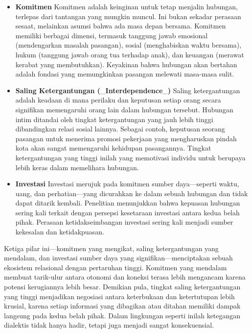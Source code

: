 \documentclass[
  letterpaper,
  DIV=11,
  numbers=noendperiod]{scrreprt}
\providecommand{\tightlist}{%
  \setlength{\itemsep}{0pt}\setlength{\parskip}{0pt}}
\begin{document}
\begin{itemize}
\tightlist
\item
  \textbf{Komitmen} Komitmen adalah keinginan untuk tetap menjalin
  hubungan, terlepas dari tantangan yang mungkin muncul. Ini bukan
  sekadar perasaan sesaat, melainkan asumsi bahwa ada masa depan
  bersama. Komitmen memiliki berbagai dimensi, termasuk tanggung jawab
  emosional (mendengarkan masalah pasangan), sosial (menghabiskan waktu
  bersama), hukum (tanggung jawab orang tua terhadap anak), dan keuangan
  (merawat kerabat yang membutuhkan). Keyakinan bahwa hubungan akan
  bertahan adalah fondasi yang memungkinkan pasangan melewati masa-masa
  sulit.
\item
  \textbf{Saling Ketergantungan (}\_\textbf{Interdependence}\_\textbf{)}
  Saling ketergantungan adalah keadaan di mana perilaku dan keputusan
  setiap orang secara signifikan memengaruhi orang lain dalam hubungan
  tersebut. Hubungan intim ditandai oleh tingkat ketergantungan yang
  jauh lebih tinggi dibandingkan relasi sosial lainnya. Sebagai contoh,
  keputusan seorang pasangan untuk menerima promosi pekerjaan yang
  mengharuskan pindah kota akan sangat memengaruhi kehidupan
  pasangannya. Tingkat ketergantungan yang tinggi inilah yang memotivasi
  individu untuk berupaya lebih keras dalam memelihara hubungan.
\item
  \textbf{Investasi} Investasi merujuk pada komitmen sumber
  daya---seperti waktu, uang, dan perhatian---yang dicurahkan ke dalam
  sebuah hubungan dan tidak dapat ditarik kembali. Penelitian
  menunjukkan bahwa kepuasan hubungan sering kali terkait dengan
  persepsi kesetaraan investasi antara kedua belah pihak. Perasaan
  ketidakseimbangan investasi sering kali menjadi sumber kekesalan dan
  ketidakpuasan.
\end{itemize}

Ketiga pilar ini---komitmen yang mengikat, saling ketergantungan yang
mendalam, dan investasi sumber daya yang signifikan---menciptakan sebuah
ekosistem relasional dengan pertaruhan tinggi. Komitmen yang mendalam
membuat tarik-ulur antara otonomi dan koneksi terasa lebih mengancam
karena potensi kerugiannya lebih besar. Demikian pula, tingkat saling
ketergantungan yang tinggi menjadikan negosiasi antara keterbukaan dan
ketertutupan lebih krusial, karena setiap informasi yang dibagikan atau
ditahan memiliki dampak langsung pada kedua belah pihak. Dalam
lingkungan seperti inilah ketegangan dialektis tidak hanya hadir, tetapi
juga menjadi sangat konsekuensial.
\end{document}
